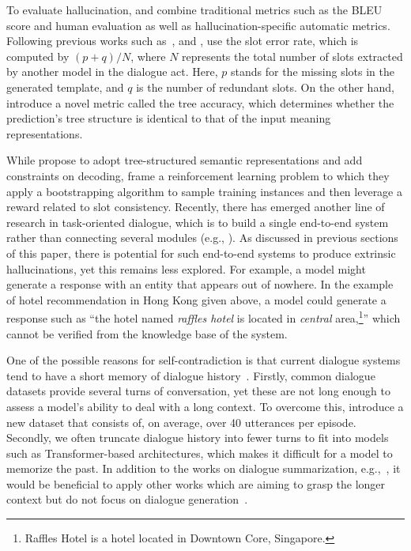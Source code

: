 To evaluate hallucination,  and  combine traditional metrics such as the BLEU score and human evaluation as well as hallucination-specific automatic metrics. Following previous works such as~, and ,  use the slot error rate, which is computed by $(p+q)/N$, where $N$ represents the total number of slots extracted by another model in the dialogue act. Here, $p$ stands for the missing slots in the generated template, and $q$ is the number of redundant slots. 
On the other hand,  introduce a novel metric called the tree accuracy, which determines whether the prediction's tree structure is identical to that of the input meaning representations.

While  propose to adopt tree-structured semantic representations and add constraints on decoding,  frame a reinforcement learning problem to which they apply a bootstrapping algorithm to sample training instances and then leverage a reward related to slot consistency. 
Recently, there has emerged another line of research in task-oriented dialogue, which is to build a single end-to-end system rather than connecting several modules (e.g., ). As discussed in previous sections of this paper, there is potential for such end-to-end systems to produce extrinsic hallucinations, yet this remains less explored. For example, a model might generate a response with an entity that appears out of nowhere. In the example of hotel recommendation in Hong Kong given above, a model could generate a response such as ``the hotel named \textit{raffles hotel} is located in \textit{central} area,\footnote{Raffles Hotel is a hotel located in Downtown Core, Singapore.}'' which cannot be verified from the knowledge base of the system.



One of the possible reasons for self-contradiction is that current dialogue systems tend to have a short memory of dialogue history~. 
Firstly, common dialogue datasets provide several turns of conversation, yet these are not long enough to assess a model's ability to deal with a long context. To overcome this,  introduce a new dataset that consists of, on average, over 40 utterances per episode. Secondly, we often truncate dialogue history into fewer turns to fit into models such as Transformer-based architectures, which makes it difficult for a model to memorize the past. In addition to the works on dialogue summarization, e.g.,~, it would be beneficial to apply other works which are aiming to grasp the longer context but do not focus on dialogue generation~.

